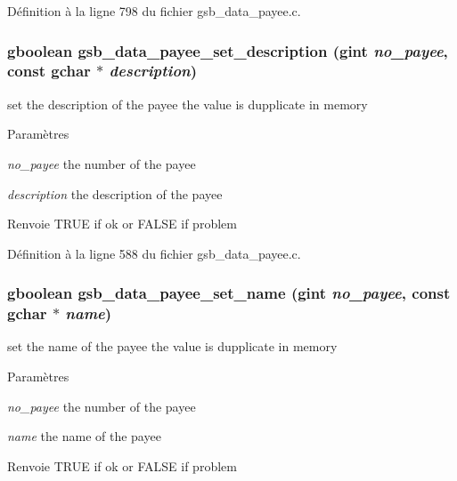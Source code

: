 Définition à la ligne 798 du fichier gsb\_\-data\_\-payee.c.

\subsubsection[{gsb\_\-data\_\-payee\_\-set\_\-description}]{\setlength{\rightskip}{0pt plus 5cm}gboolean gsb\_\-data\_\-payee\_\-set\_\-description (gint {\em no\_\-payee}, \/  const gchar $\ast$ {\em description})}\label{gsb__data__payee_8c_abf0193464c60b6a28f498ac42fe72525}
set the description of the payee the value is dupplicate in memory


\begin{DoxyParams}{Paramètres}
\item[{\em no\_\-payee}]the number of the payee \item[{\em description}]the description of the payee\end{DoxyParams}
\begin{DoxyReturn}{Renvoie}
TRUE if ok or FALSE if problem 
\end{DoxyReturn}


Définition à la ligne 588 du fichier gsb\_\-data\_\-payee.c.

\subsubsection[{gsb\_\-data\_\-payee\_\-set\_\-name}]{\setlength{\rightskip}{0pt plus 5cm}gboolean gsb\_\-data\_\-payee\_\-set\_\-name (gint {\em no\_\-payee}, \/  const gchar $\ast$ {\em name})}\label{gsb__data__payee_8c_a1763e422eefc268ed8f9c74a80a011ba}
set the name of the payee the value is dupplicate in memory


\begin{DoxyParams}{Paramètres}
\item[{\em no\_\-payee}]the number of the payee \item[{\em name}]the name of the payee\end{DoxyParams}
\begin{DoxyReturn}{Renvoie}
TRUE if ok or FALSE if problem 
\end{DoxyReturn}


